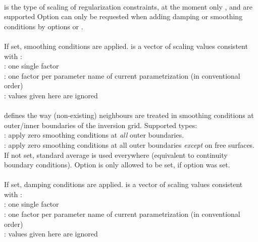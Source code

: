 \paragraph{}
 is the type of scaling of regularization constraints, at the moment only 
,  and  are supported
Option  can only be requested when adding damping or smoothing conditions by options 
 or .
\paragraph{}
If set, smoothing conditions are applied.  is a vector of scaling values consistent 
with :\\
: one single factor\\
: one factor per parameter name of current parametrization (in conventional order)\\
 : values given here are ignored
\paragraph{}
 defines the way (non-existing) neighbours are treated in smoothing conditions at outer/inner 
boundaries of the inversion grid. Supported types:\\
: apply zero smoothing conditions at \emph{all} outer boundaries.\\
: apply zero smoothing conditions at all outer boundaries \emph{except} on free surfaces. \\
If not set, standard average is used everywhere (equivalent to continuity boundary conditions).
Option  is only allowed to be set, if option  was set.
\paragraph{}
If set, damping conditions are applied.  is a vector of scaling values consistent 
with :\\
: one single factor\\
: one factor per parameter name of current parametrization (in conventional order)\\
 : values given here are ignored
